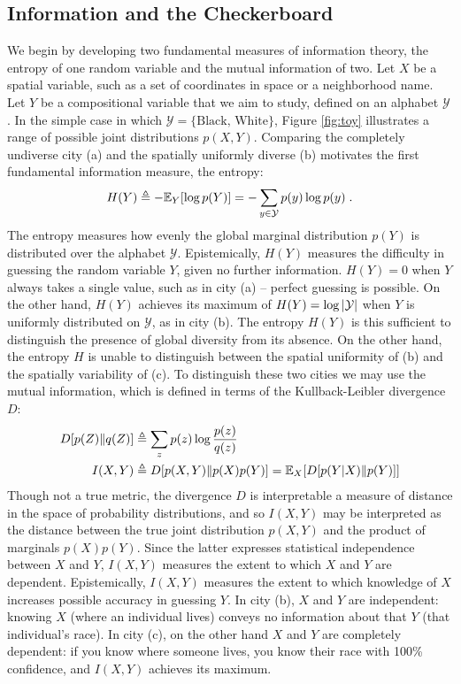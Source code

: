 	
\subsection*{Information and the Checkerboard}
	We begin by developing two fundamental measures of information theory, the entropy of one random variable and the mutual information of two. Let $X$ be a spatial variable, such as a set of coordinates in space or a neighborhood name. Let $Y$ be a compositional variable that we aim to study, defined on an alphabet $\mathcal{Y}$. In the simple case in which $\mathcal{Y}  = \{\text{Black, White}\}$, Figure \ref{fig:toy} illustrates a range of possible joint distributions $p(X,Y)$. Comparing the completely undiverse city (a) and the spatially uniformly diverse (b) motivates the first fundamental information measure, the entropy:
	\begin{equation}
		H(Y) \triangleq -\mathbb{E}_Y[\log p(Y)] = - \sum_{y \in \mathcal{Y}} p(y) \log p(y)\;.
	\end{equation}
	The entropy measures how evenly the global marginal distribution $p(Y)$ is distributed over the alphabet $\mathcal{Y}$. Epistemically, $H(Y)$ measures the difficulty in guessing the random variable $Y$, given no further information. $H(Y) = 0$ when $Y$ always takes a single value, such as in city (a) -- perfect guessing is possible. On the other hand, $H(Y)$ achieves its maximum of $H(Y) = \log \left|\mathcal{Y}\right|$ when $Y$ is uniformly distributed on $\mathcal{Y}$, as in city (b). The entropy $H(Y)$ is this sufficient to distinguish the presence of global diversity from its absence. On the other hand, the entropy $H$ is unable to distinguish between the spatial uniformity of (b) and the spatially variability of (c). To distinguish these two cities we may use the mutual information, which is defined in terms of the Kullback-Leibler divergence $D$:
	\begin{align}
		D[p(Z)\|q(Z)] &\triangleq \sum_z p(z) \log \frac{p(z)}{q(z)} \\
		I(X,Y) &\triangleq D[p(X,Y) \| p(X)p(Y)] = \mathbb{E}_X[D[p(Y|X)\|p(Y)]]
	\end{align}
	Though not a true metric, the divergence $D$ is interpretable a measure of distance in the space of probability distributions, and so $I(X,Y)$ may be interpreted as the distance between the true joint distribution $p(X,Y)$ and the product of marginals $p(X)p(Y)$. Since the latter expresses statistical independence between $X$ and $Y$, $I(X,Y)$ measures the extent to which $X$ and $Y$ are dependent. Epistemically, $I(X,Y)$ measures the extent to which knowledge of $X$increases possible accuracy in guessing $Y$. In city (b), $X$ and $Y$ are independent: knowing $X$ (where an individual lives) conveys no information about that $Y$ (that individual's race).  In city (c), on the other hand $X$ and $Y$ are completely dependent: if you know where someone lives, you know their race with 100\% confidence, and $I(X,Y)$ achieves its maximum. 

